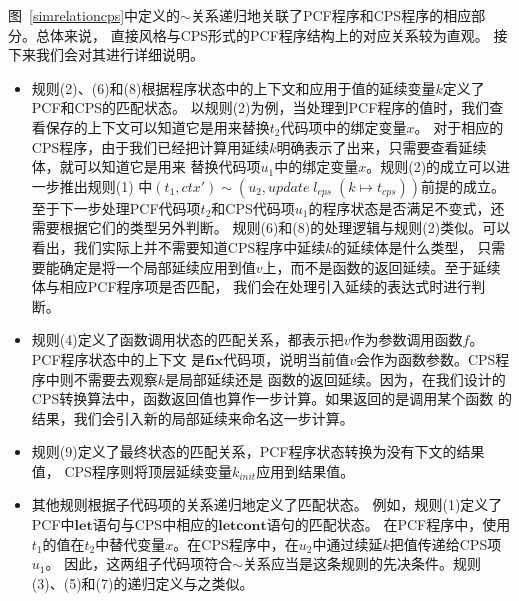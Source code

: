 图~\ref{simrelationcps}中定义的$\sim$关系递归地关联了PCF程序和CPS程序的相应部分。总体来说，
直接风格与CPS形式的PCF程序结构上的对应关系较为直观。
接下来我们会对其进行详细说明。
\begin{itemize}
  \item 规则(2)、(6)和(8)根据程序状态中的上下文和应用于值的延续变量$k$定义了PCF和CPS的匹配状态。
  以规则(2)为例，当处理到PCF程序的值时，我们查看保存的上下文可以知道它是用来替换$t_2$代码项中的绑定变量$x$。
  对于相应的CPS程序，由于我们已经把计算用延续$k$明确表示了出来，只需要查看延续体，就可以知道它是用来
  替换代码项$u_1$中的绑定变量$x$。规则(2)的成立可以进一步推出规则(1)
  中$(t_1, c t x') \sim (u_2, u p d a t e\; l_{c p s}\; (k \mapsto t_{c p s}))$前提的成立。
  至于下一步处理PCF代码项$t_2$和CPS代码项$u_1$的程序状态是否满足不变式，还需要根据它们的类型另外判断。
  规则(6)和(8)的处理逻辑与规则(2)类似。可以看出，我们实际上并不需要知道CPS程序中延续$k$的延续体是什么类型，
  只需要能确定是将一个局部延续应用到值$v$上，而不是函数的返回延续。至于延续体与相应PCF程序项是否匹配，
  我们会在处理引入延续的表达式时进行判断。
  \item 规则(4)定义了函数调用状态的匹配关系，都表示把$v$作为参数调用函数$f$。PCF程序状态中的上下文
  是$\mathbf{ fix }$代码项，说明当前值$v$会作为函数参数。CPS程序中则不需要去观察$k$是局部延续还是
  函数的返回延续。因为，在我们设计的CPS转换算法中，函数返回值也算作一步计算。如果返回的是调用某个函数
  的结果，我们会引入新的局部延续来命名这一步计算。
  \item 规则(9)定义了最终状态的匹配关系，PCF程序状态转换为没有下文的结果值，
  CPS程序则将顶层延续变量$k_{init}$应用到结果值。
  \item 其他规则根据子代码项的关系递归地定义了匹配状态。
  例如，规则(1)定义了PCF中$\mathbf{let}$语句与CPS中相应的$\mathbf{letcont}$语句的匹配状态。
  在PCF程序中，使用$t_1$的值在$t_2$中替代变量$x$。在CPS程序中，在$u_2$中通过续延$k$把值传递给CPS项$u_1$。
  因此，这两组子代码项符合$\sim$关系应当是这条规则的先决条件。规则(3)、(5)和(7)的递归定义与之类似。
\end{itemize}

